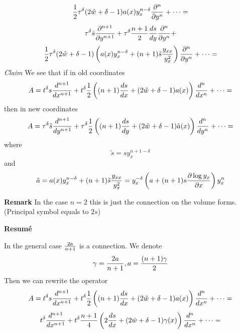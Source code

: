                          $$
                         {1\over 2}
        \tau^\delta
        (2\hat w+\delta-1)a(x)y_x^{n-\delta}
         {\partial^n\over \partial y^n}
                 +\dots=
                         $$
                         $$
                         \tau^\delta
                          \tilde s{\partial ^{n+1}\over \partial y^{n+1}}+
        \tau^\delta {n+1\over 2}{ds\over dy}{\partial^n\over \partial y^n}+
                         $$
                         $$
                         {1\over 2}
        \tau^\delta
        (2\hat w+\delta-1)
        \left(
        a(x)y_x^{n-\delta}+(n+1)\tilde s{y_{xx}\over y_x^2}
        \right)
         {\partial^n\over \partial y^n}
                 +\dots=
                         $$
{\it Claim}  We see that if in old  coordinates
                 $$
A=t^\delta
    s{d^{n+1}\over dx^{n+1}}
        +t^\delta{1\over 2}
        \left(
        (n+1){ds\over dx}+
        (2\hat w+\delta-1)a(x)
               \right) {d^{n}\over dx^{n}}+
            \dots=
                 $$
then in new coordinates
              $$
          A=\tau^\delta
    \tilde s{d^{n+1}\over dy^{n+1}}
        +\tau^\delta{1\over 2}
        \left(
        (n+1){ds\over dy}+
        (2\hat w+\delta-1)\tilde a(x)
               \right) {d^{n}\over dy^{n}}+
            \dots=
              $$
  where
             $$
         \tilde s=sy_x^{n+1-\delta}
             $$
 and
                   $$
               \tilde a=a(x)y_x^{n-\delta}+(n+1)\tilde s{y_{xx}\over y_x^2}=
               y_x^{-\delta}\left(a+(n+1)s{\partial \log y_x\over \partial x}\right)y_x^n
                   $$

{\bf Remark} In the case $n=2$ this is just the connection on the volume forms. (Principal symbol equals to $2s$)

\medskip

{\bf Resum\'e }


In the general case $2a\over n+1$ is a connection. We denote
              $$
            \gamma={2a\over n+1}, a={(n+1)\gamma\over 2}
              $$
Then we can rewrite the operator
            $$
        A=t^\delta
    s{d^{n+1}\over dx^{n+1}}
        +t^\delta{1\over 2}
        \left(
        (n+1){ds\over dx}+
        (2\hat w+\delta-1)a(x)
               \right) {d^{n}\over dx^{n}}+
            \dots=
            $$
            $$
            t^\delta
      {d^{n+1}\over dx^{n+1}}
        +t^\delta{n+1\over 4}
        \left(
        2{ds\over dx}+
        (2\hat w+\delta-1)\gamma(x)
               \right) {d^{n}\over dx^{n}}+
            \dots=
                $$
\medskip



